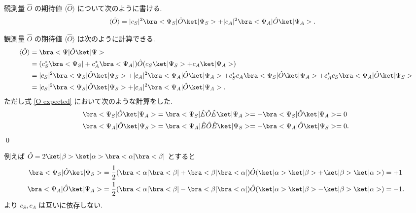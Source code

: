 \documentclass[uplatex,dvipdfmx,a4paper,11pt]{jlreq}
\makeatletter
\numberwithin{equation}{section}
\theoremstyle{definition}
\renewenvironment{proof}[1][\proofname]{\par
  \normalfont
  \topsep6\p@\@plus6\p@ \trivlist
  \item[\hskip\labelsep{\bfseries #1}\@addpunct{\bfseries}]\ignorespaces\quad\par
}{%
  \qed\endtrivlist\@endpefalse
}
\renewcommand\proofname{証明}
\makeatother
\begin{document}
\begin{proposition}[Q21-1(ix)]
  観測量 $\hat{O}$ の期待値 $\langle\hat{O}\rangle$ について次のように書ける.
  \begin{align}
    \langle\hat{O}\rangle & = |c_S|^2\bra<\Psi_S|\hat{O}\ket|\Psi_S> + |c_A|^2\bra<\Psi_A|\hat{O}\ket|\Psi_A>.
  \end{align}
\end{proposition}
\begin{proof}
  観測量 $\hat{O}$ の期待値 $\langle\hat{O}\rangle$ は次のように計算できる.
  \begin{align}
    \langle\hat{O}\rangle & = \bra<\Psi|\hat{O}\ket|\Psi>                                                                                                                                         \\
                          & = (c_S^*\bra<\Psi_S| + c_A^*\bra<\Psi_A|)\hat{O}(c_S\ket|\Psi_S> + c_A\ket|\Psi_A>)                                                                                   \\
                          & = |c_S|^2\bra<\Psi_S|\hat{O}\ket|\Psi_S> + |c_A|^2\bra<\Psi_A|\hat{O}\ket|\Psi_A> + c_S^*c_A\bra<\Psi_S|\hat{O}\ket|\Psi_A> + c_A^*c_S\bra<\Psi_A|\hat{O}\ket|\Psi_S> \\
                          & = |c_S|^2\bra<\Psi_S|\hat{O}\ket|\Psi_S> + |c_A|^2\bra<\Psi_A|\hat{O}\ket|\Psi_A>.\label{O expected}
  \end{align}
  ただし式 \eqref{O expected} において次のような計算をした.
  \begin{align}
    \bra<\Psi_S|\hat{O}\ket|\Psi_A> & = \bra<\Psi_S|\hat{E}\hat{O}\hat{E}\ket|\Psi_A> = -\bra<\Psi_S|\hat{O}\ket|\Psi_A> = 0  \\
    \bra<\Psi_A|\hat{O}\ket|\Psi_S> & = \bra<\Psi_A|\hat{E}\hat{O}\hat{E}\ket|\Psi_S> = -\bra<\Psi_A|\hat{O}\ket|\Psi_S> = 0.
  \end{align}
\end{proof}

\begin{problem}[Q21-1(x)]
例えば $\hat{O} = 2\ket|\beta>\ket|\alpha>\bra<\alpha|\bra<\beta|$ とすると
\begin{align}
  \bra<\Psi_S|\hat{O}\ket|\Psi_S> & = \frac{1}{2}(\bra<\alpha|\bra<\beta| + \bra<\beta|\bra<\alpha|)\hat{O}(\ket|\alpha>\ket|\beta> + \ket|\beta>\ket|\alpha>) = +1  \\
  \bra<\Psi_A|\hat{O}\ket|\Psi_A> & = \frac{1}{2}(\bra<\alpha|\bra<\beta| - \bra<\beta|\bra<\alpha|)\hat{O}(\ket|\alpha>\ket|\beta> - \ket|\beta>\ket|\alpha>) = -1.
\end{align}
より $c_S, c_A$ は互いに依存しない.
\end{problem}
\end{document}
